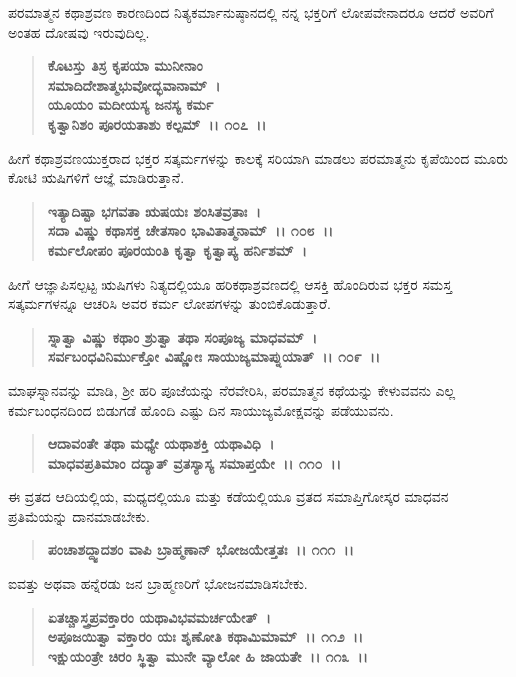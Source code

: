 ಪರಮಾತ್ಮನ ಕಥಾಶ್ರವಣ ಕಾರಣದಿಂದ ನಿತ್ಯಕರ್ಮಾನುಷ್ಠಾನದಲ್ಲಿ ನನ್ನ ಭಕ್ತರಿಗೆ ಲೋಪವೇನಾದರೂ ಆದರೆ ಅವರಿಗೆ ಅಂತಹ ದೋಷವು ಇರುವುದಿಲ್ಲ.

\begin{verse}
\textbf{ಕೊಟಸ್ತು ತಿಸ್ರ ಕೃಪಯಾ ಮುನೀನಾಂ}\\\textbf{ಸಮಾದಿದೇಶಾತ್ಮಭುವೋದ್ಭವಾನಾಮ್~।}\\\textbf{ಯೂಯಂ ಮದೀಯಸ್ಯ ಜನಸ್ಯ ಕರ್ಮ} \\\textbf{ಕೃತ್ವಾನಿಶಂ ಪೂರಯತಾಶು ಕಲ್ಪಮ್~।। ೧೦೭~।।}
\end{verse}

ಹೀಗೆ ಕಥಾಶ್ರವಣಯುಕ್ತರಾದ ಭಕ್ತರ ಸತ್ಕರ್ಮಗಳನ್ನು ಕಾಲಕ್ಕೆ ಸರಿಯಾಗಿ ಮಾಡಲು ಪರಮಾತ್ಮನು ಕೃಪೆಯಿಂದ ಮೂರು ಕೋಟಿ ಋಷಿಗಳಿಗೆ ಆಜ್ಞೆ ಮಾಡಿರುತ್ತಾನೆ.

\begin{verse}
\textbf{ಇತ್ಯಾದಿಷ್ಟಾ ಭಗವತಾ ಋಷಯಃ ಶಂಸಿತವ್ರತಾಃ~।}\\\textbf{ಸದಾ ವಿಷ್ಣು ಕಥಾಸಕ್ತ ಚೇತಸಾಂ ಭಾವಿತಾತ್ಮನಾಮ್~।। ೧೦೮~।। }\\\textbf{ಕರ್ಮಲೋಪಂ ಪೂರಯಂತಿ ಕೃತ್ವಾ ಕೃತ್ವಾಪ್ಯ ಹರ್ನಿಶಮ್~।}
\end{verse}

ಹೀಗೆ ಆಜ್ಞಾಪಿಸಲ್ಪಟ್ಟ ಋಷಿಗಳು ನಿತ್ಯದಲ್ಲಿಯೂ ಹರಿಕಥಾಶ್ರವಣದಲ್ಲಿ ಆಸಕ್ತಿ ಹೊಂದಿರುವ ಭಕ್ತರ ಸಮಸ್ತ ಸತ್ಕರ್ಮಗಳನ್ನೂ ಆಚರಿಸಿ ಅವರ ಕರ್ಮ ಲೋಪಗಳನ್ನು ತುಂಬಿಕೊಡುತ್ತಾರೆ.

\begin{verse}
\textbf{ಸ್ನಾತ್ವಾ ವಿಷ್ಣು ಕಥಾಂ ಶ್ರುತ್ವಾ ತಥಾ ಸಂಪೂಜ್ಯ ಮಾಧವಮ್~।}\\\textbf{ಸರ್ವಬಂಧವಿನಿರ್ಮುಕ್ತೋ ವಿಷ್ಣೋಃ ಸಾಯುಜ್ಯಮಾಪ್ನುಯಾತ್~।। ೧೦೯~।।}
\end{verse}

ಮಾಘಸ್ನಾನವನ್ನು ಮಾಡಿ, ಶ‍್ರೀ ಹರಿ ಪೂಜೆಯನ್ನು ನೆರವೇರಿಸಿ, ಪರಮಾತ್ಮನ ಕಥೆಯನ್ನು ಕೇಳುವವನು ಎಲ್ಲ ಕರ್ಮಬಂಧನದಿಂದ ಬಿಡುಗಡೆ ಹೊಂದಿ ಎಷ್ಟು ದಿನ ಸಾಯುಜ್ಯಮೋಕ್ಷವನ್ನು ಪಡೆಯುವನು.

\begin{verse}
\textbf{ಆದಾವಂತೇ ತಥಾ ಮಧ್ಯೇ ಯಥಾಶಕ್ತಿ ಯಥಾವಿಧಿ~।}\\\textbf{ಮಾಧವಪ್ರತಿಮಾಂ ದದ್ಯಾತ್ ವ್ರತಸ್ಯಾಸ್ಯ ಸಮಾಪ್ತಯೇ~।। ೧೧೦~।।}
\end{verse}

ಈ ವ್ರತದ ಆದಿಯಲ್ಲಿಯ, ಮಧ್ಯದಲ್ಲಿಯೂ ಮತ್ತು ಕಡೆಯಲ್ಲಿಯೂ ವ್ರತದ ಸಮಾಪ್ತಿಗೋಸ್ಕರ ಮಾಧವನ ಪ್ರತಿಮೆಯನ್ನು ದಾನಮಾಡಬೇಕು.

\begin{verse}
\textbf{ಪಂಚಾಶದ್ದ್ವಾದಶಂ ವಾಪಿ ಬ್ರಾಹ್ಮಣಾನ್ ಭೋಜಯೇತ್ತತಃ~।। ೧೧೧~।।}
\end{verse}

ಐವತ್ತು ಅಥವಾ ಹನ್ನೆರಡು ಜನ ಬ್ರಾಹ್ಮಣರಿಗೆ ಭೋಜನಮಾಡಿಸಬೇಕು.

\begin{verse}
\textbf{ಏತಚ್ಚಾಸ್ತ್ರಪ್ರವಕ್ತಾರಂ ಯಥಾವಿಭವಮರ್ಚಯೇತ್~।}\\\textbf{ಅಪೂಜಯಿತ್ವಾ ವಕ್ತಾರಂ ಯಃ ಶೃಣೋತಿ ಕಥಾಮಿಮಾಮ್~।। ೧೧೨~।। }\\\textbf{ಇಕ್ಷುಯಂತ್ರೇ ಚಿರಂ ಸ್ಥಿತ್ವಾ ಮುನೇ ವ್ಯಾಲೋ ಹಿ ಜಾಯತೇ~।। ೧೧೩~।।}
\end{verse}


